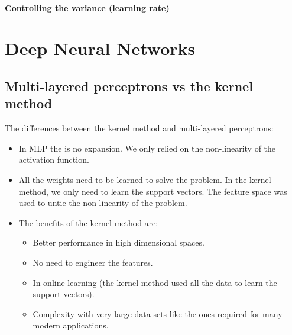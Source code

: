 \documentclass[11pt]{book} %
\begin{document}
\subsubsection{Controlling the variance (learning rate)}


%
%
%
%
%
%
%
%
%
%
%
%
%
%
%
%


\chapter{Deep Neural Networks}

\section{Multi-layered perceptrons vs the kernel method}
The differences between the kernel method and multi-layered perceptrons:
\begin{itemize}
    \item In MLP the is no expansion. We only relied on the non-linearity of the activation function.
    \item All the weights need to be learned to solve the problem. In the kernel method, we only need to learn the support vectors. 
    The feature space was used to untie the non-linearity of the problem.
    \item The benefits of the kernel method are:
    \begin{itemize}
        \item Better performance in high dimensional spaces.
        \item No need to engineer the features.
        \item In online learning (the kernel method used all the data to learn the support vectors).
        \item Complexity with very large data sets-like the ones required for many modern applications.
    \end{itemize}
\end{itemize}
\end{document}
